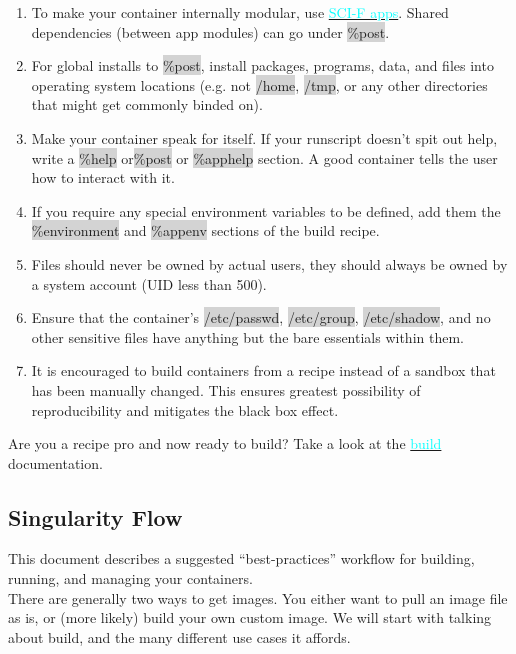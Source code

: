 \documentclass[a4paper]{article}
\begin{document}
\begin{enumerate}
\item 
To make your container internally modular, use \hyperref[sec:scifapps]{{\textcolor{cyan}{SCI-F apps}}}. Shared dependencies (between app modules) can go under \colorbox{lightgray}{\%post}.
\item
For global installs to \colorbox{lightgray}{\%post}, install packages, programs, data, and files into operating system locations (e.g. not \colorbox{lightgray}{/home}, \colorbox{lightgray}{/tmp}, or any other directories that might get commonly binded on).
\item Make your container speak for itself. If your runscript doesn’t spit out help, write a \colorbox{lightgray}{\%help} or\colorbox{lightgray}{\%post} or \colorbox{lightgray}{\%apphelp} section. A good container tells the user how to interact with it.
\item If you require any special environment variables to be defined, add them the \colorbox{lightgray}{\%environment} and \colorbox{lightgray}{\%appenv} sections of the build recipe.
\item Files should never be owned by actual users, they should always be owned by a system account (UID less than 500).
\item Ensure that the container’s \colorbox{lightgray}{/etc/passwd}, \colorbox{lightgray}{/etc/group}, \colorbox{lightgray}{/etc/shadow}, and no other sensitive files have anything but the bare essentials within them.
\item It is encouraged to build containers from a recipe instead of a sandbox that has been manually changed. This ensures greatest possibility of reproducibility and mitigates the black box effect.
\end{enumerate}

Are you a recipe pro and now ready to build? Take a look at the  \hyperref[sec:buildcontainer]{{\textcolor{cyan}{build}}} documentation.

\subsection{Singularity Flow}

This document describes a suggested “best-practices” workflow for building, running, and managing your containers.\\[0.1in]
There are generally two ways to get images. You either want to pull an image file as is, or (more likely) build your own custom image. We will start with talking about build, and the many different use cases it affords.
\end{document}
